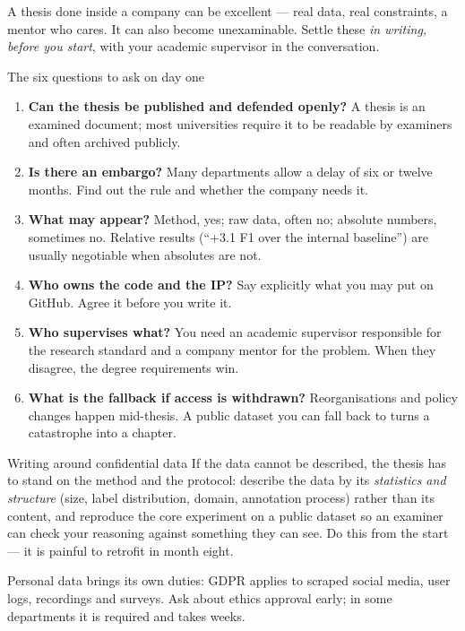 \documentclass[11pt,a4paper]{article}
\begin{document}
A thesis done inside a company can be excellent --- real data, real
constraints, a mentor who cares. It can also become unexaminable. Settle these
\emph{in writing, before you start}, with your academic supervisor in the
conversation.

\begin{cbox}{The six questions to ask on day one}
\begin{enumerate}
  \item \textbf{Can the thesis be published and defended openly?} A thesis is
        an examined document; most universities require it to be readable by
        examiners and often archived publicly.
  \item \textbf{Is there an embargo?} Many departments allow a delay of six or
        twelve months. Find out the rule and whether the company needs it.
  \item \textbf{What may appear?} Method, yes; raw data, often no; absolute
        numbers, sometimes no. Relative results (``+3.1 F1 over the internal
        baseline'') are usually negotiable when absolutes are not.
  \item \textbf{Who owns the code and the IP?} Say explicitly what you may put
        on GitHub. Agree it before you write it.
  \item \textbf{Who supervises what?} You need an academic supervisor
        responsible for the research standard and a company mentor for the
        problem. When they disagree, the degree requirements win.
  \item \textbf{What is the fallback if access is withdrawn?} Reorganisations
        and policy changes happen mid-thesis. A public dataset you can fall
        back to turns a catastrophe into a chapter.
\end{enumerate}
\end{cbox}

\begin{wbox}{Writing around confidential data}
If the data cannot be described, the thesis has to stand on the method and the
protocol: describe the data by its \emph{statistics and structure} (size,
label distribution, domain, annotation process) rather than its content, and
reproduce the core experiment on a public dataset so an examiner can check
your reasoning against something they can see. Do this from the start --- it
is painful to retrofit in month eight.
\end{wbox}

Personal data brings its own duties: GDPR applies to scraped social media,
user logs, recordings and surveys. Ask about ethics approval early; in some
departments it is required and takes weeks.
\end{document}
